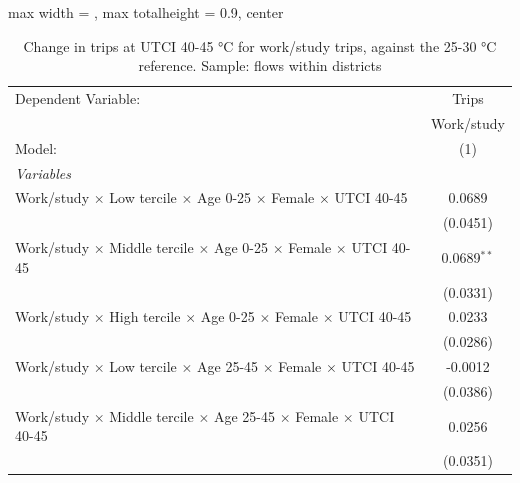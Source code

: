 
\begin{table}[htbp]
   \caption{\label{table_intersectionality_work_or_study_40-45} Change in trips at UTCI 40-45 °C for work/study trips, against the 25-30 °C reference. Sample: flows within districts}
   \centering
   \small
   \begin{adjustbox}{max width = \textwidth, max totalheight = 0.9\textheight, center}
      \begin{tabular}{lc}
         \tabularnewline \midrule \midrule
         Dependent Variable:                                                                            & Trips\\  
                                                                                                        & Work/study \\   
         Model:                                                                                         & (1)\\  
         \midrule
         \emph{Variables}\\
         Work/study $\times$ Low tercile $\times$ Age 0-25 $\times$ Female $\times$ UTCI 40-45          & 0.0689\\   
                                                                                                        & (0.0451)\\   
         Work/study $\times$ Middle tercile $\times$ Age 0-25 $\times$ Female $\times$ UTCI 40-45       & 0.0689$^{**}$\\   
                                                                                                        & (0.0331)\\   
         Work/study $\times$ High tercile $\times$ Age 0-25 $\times$ Female $\times$ UTCI 40-45         & 0.0233\\   
                                                                                                        & (0.0286)\\   
         Work/study $\times$ Low tercile $\times$ Age 25-45 $\times$ Female $\times$ UTCI 40-45         & -0.0012\\   
                                                                                                        & (0.0386)\\   
         Work/study $\times$ Middle tercile $\times$ Age 25-45 $\times$ Female $\times$ UTCI 40-45      & 0.0256\\   
                                                                                                        & (0.0351)\\   

\end{tabular}
\end{adjustbox}
\end{table}

